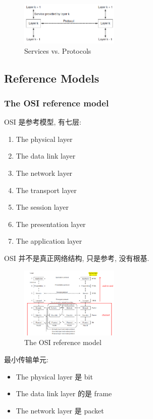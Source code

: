 \begin{figure}[!htb]
    \centering
    \includegraphics[width=0.42\textwidth]{pic/CN1/Services vs. Protocols}
    \caption{Services vs. Protocols}
\end{figure}

\subsection{Reference Models}
\subsubsection{The OSI reference model}
OSI 是参考模型, 有七层:
\begin{enumerate}
    \item The physical layer
    \item The data link layer
    \item The network layer
    \item The transport layer
    \item The session layer
    \item The presentation layer
    \item The application layer
\end{enumerate}
OSI 并不是真正网络结构, 只是参考, 没有根基. 

\begin{figure}[!htb]
    \centering
    \includegraphics[width=0.42\textwidth]{pic/CN1/OSI.png}
    \caption{The OSI reference model}
\end{figure}

最小传输单元:
\begin{itemize}
    \item The physical layer 是 bit
    \item The data link layer 的是 frame
    \item The network layer 是 packet
\end{itemize}

